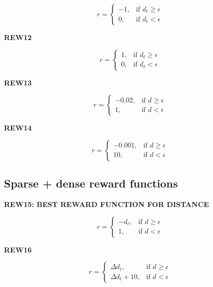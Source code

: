 \documentclass{article}
\begin{document}
\begin{equation}
r = \begin{cases}
    -1, & \text{if $d_t \geq \epsilon $}\\
    0, & \text{if $d_t < \epsilon $}
  \end{cases}
\end{equation}

\textbf{REW12}

\begin{equation}
r = \begin{cases}
    1, & \text{if $d_t \geq \epsilon $}\\
    0, & \text{if  $d_t < \epsilon $}
  \end{cases}
\end{equation}

\textbf{REW13}

\begin{equation}
r = \begin{cases}
    - 0.02 , & \text{if $d \geq \epsilon $}\\
    1 , & \text{if $d < \epsilon $}
  \end{cases}
\end{equation}

\textbf{REW14}

\begin{equation}
r = \begin{cases}
    - 0.001 , & \text{if $d \geq \epsilon $}\\
    10 , & \text{if $d < \epsilon $}
  \end{cases}
\end{equation}

\subsection{Sparse + dense reward functions}


\textbf{REW15: BEST REWARD FUNCTION FOR DISTANCE}

\begin{equation}
r = \begin{cases}
    - d_t , & \text{if $d \geq \epsilon $}\\
    1 , & \text{if $d < \epsilon $}
  \end{cases}
\end{equation}


\textbf{REW16}

\begin{equation}
r = \begin{cases}
\Delta d_t, & \text{if $d \geq \epsilon $}\\
\Delta d_t + 10, & \text{if $d < \epsilon $}
  \end{cases}
\end{equation}
\end{document}
